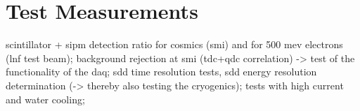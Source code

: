 \chapter{Test Measurements}
\label{chap:TestMeasurements}

scintillator + sipm detection ratio for cosmics (smi) and for 500 mev electrons (lnf test beam); background rejection at smi (tdc+qdc correlation) -> test of the functionality of the daq; sdd time resolution tests, sdd energy resolution determination (-> thereby also testing the cryogenics); tests with high current and water cooling; 